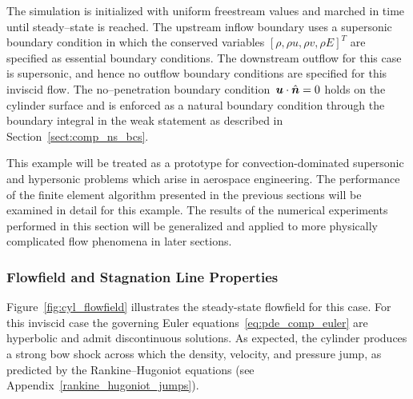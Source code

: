 The simulation is initialized with uniform freestream values and marched in time until steady--state is reached.  The upstream inflow boundary uses a supersonic  boundary condition in which the conserved variables $\left[\rho, \rho u, \rho v, \rho E\right]^T$ are specified as essential boundary conditions. The downstream outflow for this case is supersonic, and hence no outflow boundary conditions are specified for this inviscid flow.  The no--penetration boundary condition~${\boldsymbol{u}}\cdot\hat{{\boldsymbol{n}}}=0$ holds on the cylinder surface and is enforced as a natural boundary condition through the boundary integral in the weak statement as described in Section~\ref{sect:comp_ns_bcs}.

This example will be treated as a prototype for convection-dominated supersonic and hypersonic problems which arise in aerospace engineering.  The performance of the finite element algorithm presented in the previous sections will be examined in detail for this example.  The results of the numerical experiments performed in this section will be generalized and applied to more physically complicated flow phenomena in later sections.

\subsubsection{Flowfield and Stagnation Line Properties}
Figure~\ref{fig:cyl_flowfield} illustrates the steady-state flowfield for this case.  For this inviscid case the governing Euler equations~\eqref{eq:pde_comp_euler} are hyperbolic and admit discontinuous solutions. As expected, the cylinder produces a strong bow shock across which the density, velocity, and pressure jump, as predicted by the Rankine--Hugoniot equations (see Appendix~\ref{rankine_hugoniot_jumps}). 

